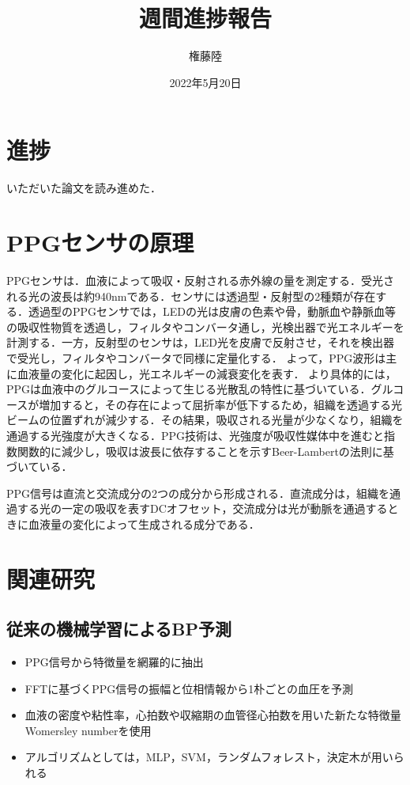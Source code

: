 \documentclass[dvipdfmx]{jsarticle}
\begin{document}
\title{週間進捗報告}
\author{権藤陸}
\date{2022年5月20日}
\maketitle
\section{進捗}
いただいた論文を読み進めた．
\section{PPGセンサの原理}
PPGセンサは．血液によって吸収・反射される赤外線の量を測定する．受光される光の波長は約940nmである．センサには透過型・反射型の2種類が存在する．透過型のPPGセンサでは，LEDの光は皮膚の色素や骨，動脈血や静脈血等の吸収性物質を透過し，フィルタやコンバータ通し，光検出器で光エネルギーを計測する．一方，反射型のセンサは，LED光を皮膚で反射させ，それを検出器で受光し，フィルタやコンバータで同様に定量化する．
よって，PPG波形は主に血液量の変化に起因し，光エネルギーの減衰変化を表す．
より具体的には，PPGは血液中のグルコースによって生じる光散乱の特性に基づいている．グルコースが増加すると，その存在によって屈折率が低下するため，組織を透過する光ビームの位置ずれが減少する．その結果，吸収される光量が少なくなり，組織を通過する光強度が大きくなる．PPG技術は、光強度が吸収性媒体中を進むと指数関数的に減少し，吸収は波長に依存することを示すBeer-Lambertの法則に基づいている．

PPG信号は直流と交流成分の2つの成分から形成される．直流成分は，組織を通過する光の一定の吸収を表すDCオフセット，交流成分は光が動脈を通過するときに血液量の変化によって生成される成分である．


\section{関連研究}
\subsection{従来の機械学習によるBP予測}
\begin{itemize}
    \item PPG信号から特徴量を網羅的に抽出
    \item FFTに基づくPPG信号の振幅と位相情報から1朴ごとの血圧を予測
    \item 血液の密度や粘性率，心拍数や収縮期の血管径心拍数を用いた新たな特徴量Womersley numberを使用
    \item アルゴリズムとしては，MLP，SVM，ランダムフォレスト，決定木が用いられる
\end{itemize}
\end{document}
